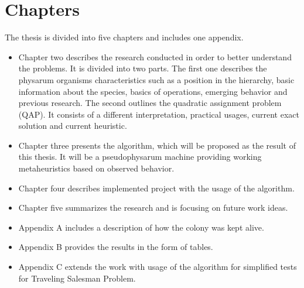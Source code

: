 \section{Chapters}
\label{section:introduction_chapters}

The thesis is divided into five chapters and includes one appendix.

\begin{itemize}
  \item Chapter two describes the research conducted in order to better understand the problems. It is divided into two parts. The first one describes the physarum organisms characteristics such as a position in the hierarchy, basic information about the species, basics of operations, emerging behavior and previous research. The second outlines the quadratic assignment problem (QAP). It consists of a different interpretation, practical usages, current exact solution and current heuristic.
  \item Chapter three presents the algorithm, which will be proposed as the result of this thesis. It will be a pseudophysarum machine providing working metaheuristics based on observed behavior.
  \item Chapter four describes implemented project with the usage of the algorithm.
  \item Chapter five summarizes the research and is focusing on future work ideas.
  \item Appendix A includes a description of how the colony was kept alive.
  \item Appendix B provides the results in the form of tables.
  \item Appendix C extends the work with usage of the algorithm for simplified tests for Traveling Salesman Problem.
\end{itemize}
